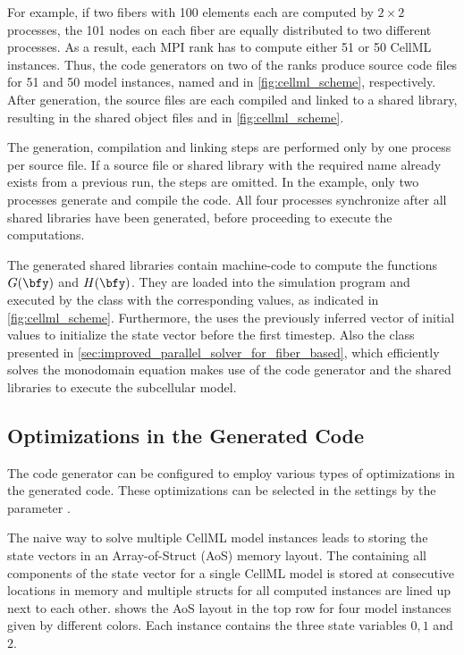For example, if two fibers with 100 elements each are computed by $2 \times 2$ processes, the 101 nodes on each fiber are equally distributed to two different processes. As a result, each MPI rank has to compute either 51 or 50 CellML instances. Thus, the code generators on two of the ranks produce source code files for 51 and 50 model instances, named  and  in \cref{fig:cellml_scheme}, respectively. After generation, the source files are each compiled and linked to a shared library, resulting in the shared object files  and  in \cref{fig:cellml_scheme}.

The generation, compilation and linking steps are performed only by one process per source file.
If a source file or shared library with the required name already exists from a previous run, the steps are omitted.
In the example, only two processes generate and compile the code. All four processes synchronize after all shared libraries have been generated, before proceeding to execute the computations.

The generated shared libraries contain machine-code to compute the functions $G(\bfy)$ and $H(\bfy)$. They are loaded into the simulation program and executed by the  class with the corresponding values, as indicated in \cref{fig:cellml_scheme}. Furthermore, the  uses the previously inferred vector of initial values to initialize the state vector before the first timestep. Also the  class presented in \cref{sec:improved_parallel_solver_for_fiber_based}, which efficiently solves the monodomain equation makes use of the code generator and the shared libraries to execute the subcellular model.

\subsection{Optimizations in the Generated Code}\label{sec:optimizations_in_the_generated}

The code generator can be configured to employ various types of optimizations in the generated code. These optimizations can be selected in the settings by the parameter .

The naive way to solve multiple CellML model instances leads to storing the state vectors
in an Array-of-Struct (AoS) memory layout. The  containing all components of the state vector for a single CellML model is stored at consecutive locations in memory and multiple structs for all computed instances are lined up next to each other.  shows the AoS layout in the top row for four model instances given by different colors. Each instance contains the three state variables $0,1$ and $2$. 

